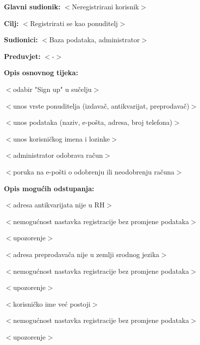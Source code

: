 \begin{packed_enum}
					\noindent {}
					\begin{packed_item}
						\item \textbf{Glavni sudionik: }$<$Neregistrirani korisnik$>$
						\item  \textbf{Cilj:} $<$Registrirati se kao ponuditelj$>$
						\item  \textbf{Sudionici:} $<$Baza podataka, administrator$>$
						\item  \textbf{Preduvjet:} $<$-$>$
						\item  \textbf{Opis osnovnog tijeka:}
						\item[] \begin{packed_enum}
							\item $<$odabir "Sign up" u sučelju$>$
							\item $<$unos vrste ponuditelja (izdavač, antikvarijat, preprodavač)$>$
							\item $<$unos podataka (naziv, e-pošta, adresa, broj telefona)$>$
							\item $<$unos korisničkog imena i lozinke$>$
							\item $<$administrator odobrava račun$>$
							\item $<$poruka na e-pošti o odobrenju ili neodobrenju računa$>$
						\end{packed_enum}
						\item  \textbf{Opis mogućih odstupanja:}
						\item[] \begin{packed_item}
							\item[3.a] $<$adresa antikvarijata nije u RH$>$
							\item[] \begin{packed_enum}
								\item $<$nemogućnost nastavka registracije bez promjene podataka$>$
								\item $<$upozorenje$>$
							\end{packed_enum}
							\item[3.b] $<$adresa preprodavača nije u zemlji srodnog jezika$>$
							\item[] \begin{packed_enum}
								\item $<$nemogućnost nastavka registracije bez promjene podataka$>$
								\item $<$upozorenje$>$
							\end{packed_enum}
							\item[4.a] $<$korisničko ime već postoji$>$
							\item[] \begin{packed_enum}
								\item $<$nemogućnost nastavka registracije bez promjene podataka$>$
								\item $<$upozorenje$>$
							\end{packed_enum}	
						\end{packed_item}
					\end{packed_item}
				

\end{packed_enum}
